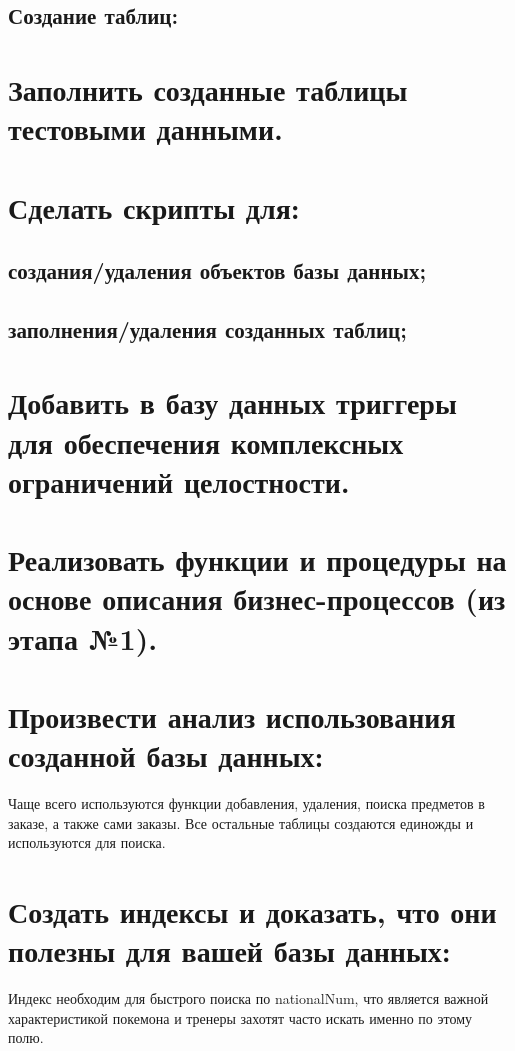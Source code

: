 \documentclass[12pt,onecolumn]{article}
\begin{document}
\subsection{Создание таблиц:}



\section{Заполнить созданные таблицы тестовыми данными.}



\section{Сделать скрипты для:}
\subsection{создания/удаления объектов базы данных;}

\subsection{заполнения/удаления созданных таблиц;}


\section{Добавить в базу данных триггеры для обеспечения комплексных ограничений
целостности.}

\section{Реализовать функции и процедуры на основе описания бизнес-процессов (из этапа
№1).}


\section{Произвести анализ использования созданной базы данных:}
Чаще всего используются функции добавления, удаления, поиска предметов в заказе, а также сами заказы.
Все остальные таблицы создаются единожды и используются для поиска.
\section{Создать индексы и доказать, что они полезны для вашей базы данных:}

Индекс необходим для быстрого поиска по nationalNum, что является важной характеристикой покемона и тренеры захотят часто искать именно по этому полю.
\end{document}

